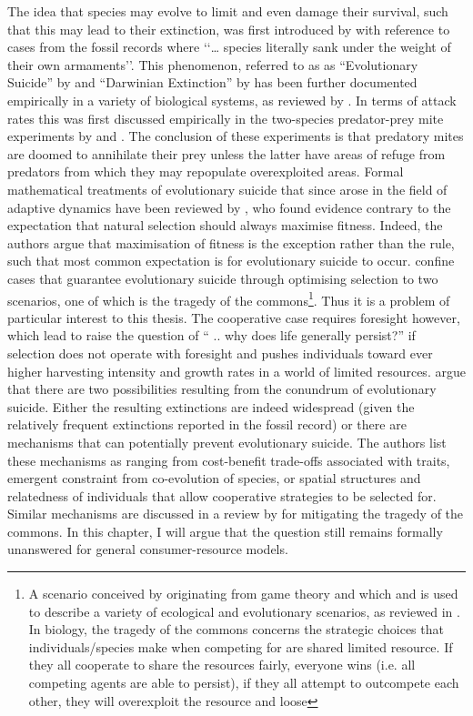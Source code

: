 \documentclass[a4paper]{report}
\begin{document}
The idea that species may evolve to limit and even damage their survival, such that this may lead to their extinction,  was first introduced by \citep{Haldane1932} with reference to cases from the fossil records where ‘‘… species literally sank under the weight of their own armaments’’. This phenomenon, referred to as as “Evolutionary Suicide” by \citep{Parvinen2005} and “Darwinian Extinction” by \citep{Webb2003} has been further documented empirically in a variety of biological systems, as reviewed by \citep{Rankin2005}. In terms of attack rates this was first discussed empirically in the two-species predator-prey mite experiments by \citep{gausse1934} and \citep{Gause1936}. The conclusion of these experiments is that predatory mites are doomed to annihilate their prey unless the latter have areas of refuge from predators from which they may repopulate overexploited areas. Formal mathematical treatments of evolutionary suicide that since arose in the field of adaptive dynamics have been reviewed by \citep{Ferr2004}, who found evidence contrary to the expectation that natural selection should always maximise fitness. Indeed, the authors argue that maximisation of fitness is the exception rather than the rule, such that most common expectation is for evolutionary suicide to occur. \citep{Parvivnen2013} confine cases that guarantee evolutionary suicide through optimising selection to two scenarios, one of which is the tragedy of the commons\footnote{A scenario conceived by \citep{Hardin1968} originating from game theory and which and is used to describe a variety of ecological and evolutionary scenarios, as reviewed in \citep{Rankin2007}. In biology, the tragedy of the commons concerns the strategic choices that individuals/species make when competing for are shared limited resource. If they all cooperate to share the resources fairly, everyone wins (i.e. all competing agents are able to persist), if they all attempt to outcompete each other, they will overexploit the resource and loose}. Thus it is a problem of particular interest to this thesis. The cooperative case requires foresight however, which lead \citep{Parvivnen2013} to raise the question of “ .. why does life generally persist?” if selection does not operate with foresight and pushes individuals toward ever higher harvesting intensity and growth rates in a world of limited resources. \citep{Parvivnen2013} argue that there are two possibilities resulting from the conundrum of evolutionary suicide. Either the resulting extinctions are indeed widespread (given the relatively frequent extinctions reported in the fossil record) or there are mechanisms that can potentially prevent evolutionary suicide. The authors list these mechanisms as ranging from cost-benefit trade-offs associated with traits, emergent constraint from co-evolution of species, or spatial structures and relatedness of individuals that allow cooperative strategies to be selected for. Similar mechanisms are discussed in a review by \citep{Rankin2007} for mitigating the tragedy of the commons. In this chapter, I will argue that the question still remains formally unanswered for general consumer-resource models. \\
\end{document}
